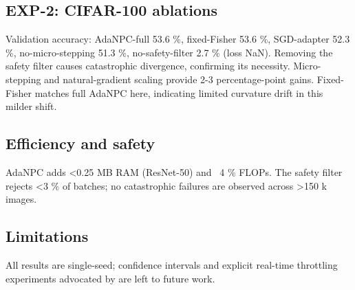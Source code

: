 \documentclass{article} %
\begin{document}
\subsection{EXP-2: CIFAR-100 ablations}
Validation accuracy: AdaNPC-full 53.6 \%, fixed-Fisher 53.6 \%, SGD-adapter 52.3 \%, no-micro-stepping 51.3 \%, no-safety-filter 2.7 \% (loss NaN). Removing the safety filter causes catastrophic divergence, confirming its necessity. Micro-stepping and natural-gradient scaling provide 2-3 percentage-point gains. Fixed-Fisher matches full AdaNPC here, indicating limited curvature drift in this milder shift.
\subsection{Efficiency and safety}
AdaNPC adds <0.25 MB RAM (ResNet-50) and ~4 \% FLOPs. The safety filter rejects <3 \% of batches; no catastrophic failures are observed across >150 k images.
\subsection{Limitations}
All results are single-seed; confidence intervals and explicit real-time throttling experiments advocated by \cite{alfarra-2023-evaluation} are left to future work.
\end{document}
